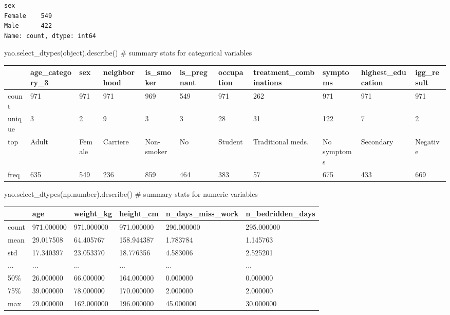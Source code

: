 \documentclass[
  letterpaper,
  DIV=11,
  numbers=noendperiod]{scrreprt}
\newenvironment{Shaded}{\begin{snugshade}}{\end{snugshade}}
\newcommand{\BuiltInTok}[1]{\textcolor[rgb]{0.00,0.23,0.31}{#1}}
\newcommand{\CommentTok}[1]{\textcolor[rgb]{0.37,0.37,0.37}{#1}}
\newcommand{\NormalTok}[1]{\textcolor[rgb]{0.00,0.23,0.31}{#1}}
\begin{document}
\begin{tcolorbox}
\begin{verbatim}
sex
Female    549
Male      422
Name: count, dtype: int64
\end{verbatim}

\begin{Shaded}
\begin{Highlighting}[]
\NormalTok{yao.select\_dtypes(}\BuiltInTok{object}\NormalTok{).describe() }\CommentTok{\# summary stats for categorical variables}
\end{Highlighting}
\end{Shaded}

\begin{longtable}[]{@{}lllllllllll@{}}
\toprule\noalign{}
& age\_category\_3 & sex & neighborhood & is\_smoker & is\_pregnant &
occupation & treatment\_combinations & symptoms & highest\_education &
igg\_result \\
\midrule\noalign{}
\endhead
\bottomrule\noalign{}
\endlastfoot
count & 971 & 971 & 971 & 969 & 549 & 971 & 262 & 971 & 971 & 971 \\
unique & 3 & 2 & 9 & 3 & 3 & 28 & 31 & 122 & 7 & 2 \\
top & Adult & Female & Carriere & Non-smoker & No & Student &
Traditional meds. & No symptoms & Secondary & Negative \\
freq & 635 & 549 & 236 & 859 & 464 & 383 & 57 & 675 & 433 & 669 \\
\end{longtable}

\begin{Shaded}
\begin{Highlighting}[]
\NormalTok{yao.select\_dtypes(np.number).describe() }\CommentTok{\# summary stats for numeric variables}
\end{Highlighting}
\end{Shaded}

\begin{longtable}[]{@{}llllll@{}}
\toprule\noalign{}
& age & weight\_kg & height\_cm & n\_days\_miss\_work &
n\_bedridden\_days \\
\midrule\noalign{}
\endhead
\bottomrule\noalign{}
\endlastfoot
count & 971.000000 & 971.000000 & 971.000000 & 296.000000 &
295.000000 \\
mean & 29.017508 & 64.405767 & 158.944387 & 1.783784 & 1.145763 \\
std & 17.340397 & 23.053370 & 18.776356 & 4.583006 & 2.525201 \\
... & ... & ... & ... & ... & ... \\
50\% & 26.000000 & 66.000000 & 164.000000 & 0.000000 & 0.000000 \\
75\% & 39.000000 & 78.000000 & 170.000000 & 2.000000 & 2.000000 \\
max & 79.000000 & 162.000000 & 196.000000 & 45.000000 & 30.000000 \\
\end{longtable}

\end{tcolorbox}
\end{document}
